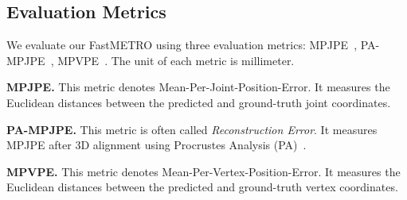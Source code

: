 \subsection{Evaluation Metrics}
We evaluate our FastMETRO using three evaluation metrics:
MPJPE~\cite{wang2014h36m}, PA-MPJPE~\cite{zhou2018monocap}, MPVPE~\cite{pavlakos_2018_mpve}.
The unit of each metric is millimeter.

\noindent \textbf{MPJPE.}
This metric denotes Mean-Per-Joint-Position-Error.
It measures the Euclidean distances between the predicted and ground-truth joint coordinates.

\noindent \textbf{PA-MPJPE.}
This metric is often called \textit{Reconstruction Error}.
It measures MPJPE after 3D alignment using Procrustes Analysis (PA)~\cite{gower_1975_pa}.

\noindent \textbf{MPVPE.}
This metric denotes Mean-Per-Vertex-Position-Error.
It measures the Euclidean distances between the predicted and ground-truth vertex coordinates.

